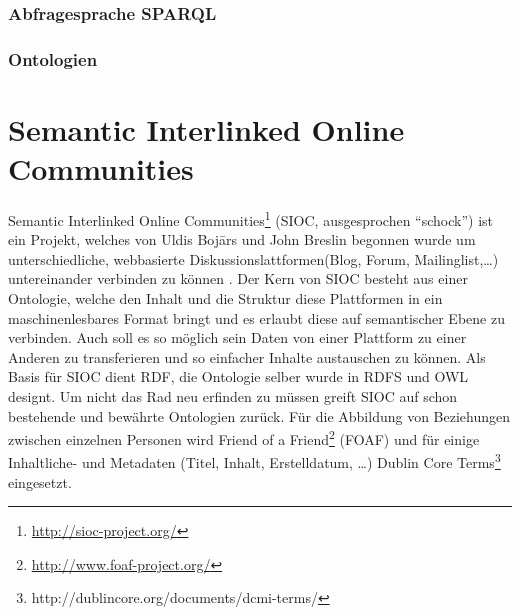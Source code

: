 
\subsubsection{Abfragesprache SPARQL} %
\label{ssub:abfragesprache_sparql}


\subsubsection{Ontologien} %
\label{ssub:ontologien}



\section{Semantic Interlinked Online Communities} %
\label{sec:verw_arbeiten_sioc}

Semantic Interlinked Online Communities\footnote{\url{http://sioc-project.org/}} (SIOC, ausgesprochen \enquote{schock}) ist ein Projekt, welches von Uldis Boj\=ars und John Breslin begonnen wurde um unterschiedliche, webbasierte Diskussionslattformen(Blog, Forum, Mailinglist,\dots) untereinander verbinden zu können \cite{Breslin2005}. Der Kern von SIOC besteht aus einer Ontologie, welche den Inhalt und die Struktur diese Plattformen in ein maschinenlesbares Format bringt und es erlaubt diese auf semantischer Ebene zu verbinden. Auch soll es so möglich sein Daten von einer Plattform zu einer Anderen zu transferieren und so einfacher Inhalte austauschen zu können. Als Basis für SIOC dient RDF, die Ontologie selber wurde in RDFS und OWL designt. Um nicht das Rad neu erfinden zu müssen greift SIOC auf schon bestehende und bewährte Ontologien zurück. Für die Abbildung von Beziehungen zwischen einzelnen Personen wird Friend of a Friend\footnote{\url{http://www.foaf-project.org/}} (FOAF) und für einige Inhaltliche- und Metadaten (Titel, Inhalt, Erstelldatum, \dots) Dublin Core Terms\footnote{http://dublincore.org/documents/dcmi-terms/} eingesetzt.


